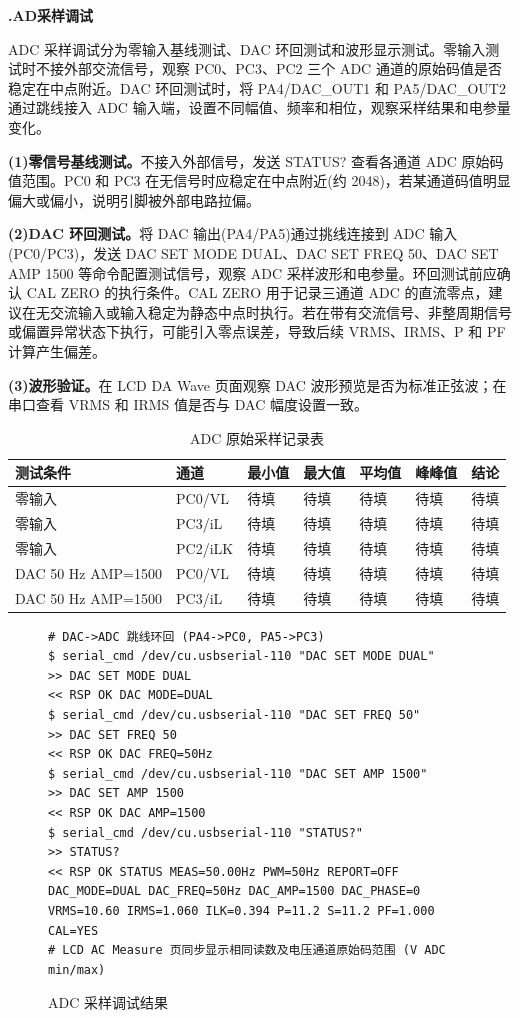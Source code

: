 \documentclass[UTF8,a4paper,zihao=-4,fontset=macnew]{ctexart}
\makeatletter
\def\@extractsubnum#1.#2\@nil{#2}
\newcommand{\subsectiontitle}[2]{%
  \setcounter{subsection}{\numexpr\@extractsubnum#1\@nil-1\relax}\refstepcounter{subsection}%
  \vspace{0.34cm}%
  {\noindent\heiti\bfseries\fontsize{16pt}{18pt}\selectfont #1.\quad #2\par}%
  \vspace{0.54cm}%
}
\makeatother
\begin{document}
\subsectiontitle{7.3}{AD采样调试}
\label{sec:debug-ad}

ADC 采样调试分为零输入基线测试、DAC 环回测试和波形显示测试。零输入测试时不接外部交流信号，观察 PC0、PC3、PC2 三个 ADC 通道的原始码值是否稳定在中点附近。DAC 环回测试时，将 PA4/DAC\_OUT1 和 PA5/DAC\_OUT2 通过跳线接入 ADC 输入端，设置不同幅值、频率和相位，观察采样结果和电参量变化。

\textbf{(1)零信号基线测试。}不接入外部信号，发送 STATUS? 查看各通道 ADC 原始码值范围。PC0 和 PC3 在无信号时应稳定在中点附近(约 2048)，若某通道码值明显偏大或偏小，说明引脚被外部电路拉偏。

\textbf{(2)DAC 环回测试。}将 DAC 输出(PA4/PA5)通过挑线连接到 ADC 输入(PC0/PC3)，发送 DAC SET MODE DUAL、DAC SET FREQ 50、DAC SET AMP 1500 等命令配置测试信号，观察 ADC 采样波形和电参量。环回测试前应确认 CAL ZERO 的执行条件。CAL ZERO 用于记录三通道 ADC 的直流零点，建议在无交流输入或输入稳定为静态中点时执行。若在带有交流信号、非整周期信号或偏置异常状态下执行，可能引入零点误差，导致后续 VRMS、IRMS、P 和 PF 计算产生偏差。

\textbf{(3)波形验证。}在 LCD DA Wave 页面观察 DAC 波形预览是否为标准正弦波；在串口查看 VRMS 和 IRMS 值是否与 DAC 幅度设置一致。

\begin{table}[H]
\centering
{}
\caption{ADC 原始采样记录表}
\label{tab:adc-raw}
\begin{tabular}{lllllll}
\toprule
测试条件 & 通道 & 最小值 & 最大值 & 平均值 & 峰峰值 & 结论 \\
\midrule
零输入 & PC0/VL & 待填 & 待填 & 待填 & 待填 & 待填 \\
零输入 & PC3/iL & 待填 & 待填 & 待填 & 待填 & 待填 \\
零输入 & PC2/iLK & 待填 & 待填 & 待填 & 待填 & 待填 \\
DAC 50 Hz AMP=1500 & PC0/VL & 待填 & 待填 & 待填 & 待填 & 待填 \\
DAC 50 Hz AMP=1500 & PC3/iL & 待填 & 待填 & 待填 & 待填 & 待填 \\
\bottomrule
\end{tabular}
\end{table}


\begin{figure}[H]
\centering
\begin{lstlisting}[style=serialterm]
# DAC->ADC 跳线环回 (PA4->PC0, PA5->PC3)
$ serial_cmd /dev/cu.usbserial-110 "DAC SET MODE DUAL"
>> DAC SET MODE DUAL
<< RSP OK DAC MODE=DUAL
$ serial_cmd /dev/cu.usbserial-110 "DAC SET FREQ 50"
>> DAC SET FREQ 50
<< RSP OK DAC FREQ=50Hz
$ serial_cmd /dev/cu.usbserial-110 "DAC SET AMP 1500"
>> DAC SET AMP 1500
<< RSP OK DAC AMP=1500
$ serial_cmd /dev/cu.usbserial-110 "STATUS?"
>> STATUS?
<< RSP OK STATUS MEAS=50.00Hz PWM=50Hz REPORT=OFF DAC_MODE=DUAL DAC_FREQ=50Hz DAC_AMP=1500 DAC_PHASE=0 VRMS=10.60 IRMS=1.060 ILK=0.394 P=11.2 S=11.2 PF=1.000 CAL=YES
# LCD AC Measure 页同步显示相同读数及电压通道原始码范围 (V ADC min/max)
\end{lstlisting}
\caption{ADC 采样调试结果}
\label{fig:debug-adc}
\end{figure}
\end{document}
